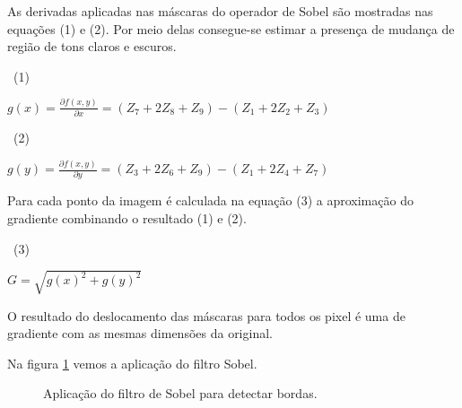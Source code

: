 As derivadas aplicadas nas máscaras do operador de Sobel são mostradas nas equações (1) e (2). Por meio delas consegue-se estimar a presença de mudança de região  de tons claros e escuros.

\ (1) 
\begin{center}
    $g(x)=\frac{\partial f(x,y)}{\partial x}=(Z_{7}+2Z_{8}+Z_{9})-(Z_{1}+2Z_{2}+Z_{3})$ 
\end{center}

\ (2)
\begin{center}
    $g(y)=\frac{\partial f(x,y)}{\partial y}=(Z_{3}+2Z_{6}+Z_{9})-(Z_{1}+2Z_{4}+Z_{7})$ 
\end{center}

Para cada ponto da imagem  é calculada na equação (3) a aproximação do gradiente combinando o resultado (1) e (2).

\ (3)
\begin{center}
    $G=\sqrt{g(x)^{2} + g(y)^{2}}$
\end{center}

O resultado do deslocamento das máscaras para todos os pixel é uma de gradiente com as mesmas dimensões da original. \cite{digitalImgProcess2010}

Na figura \ref{subfig:filtro-sobel} vemos a aplicação do filtro Sobel.

\begin{figure}[h]
 \centering
   \qquad
   \caption{ Aplicação do filtro de Sobel para detectar bordas.}
  \label{subfig:filtro-sobel}
\end{figure}


